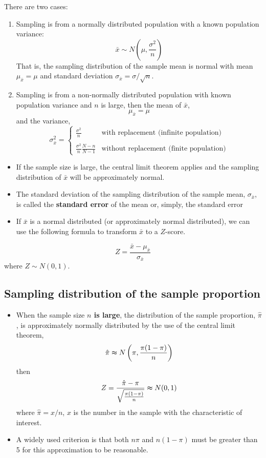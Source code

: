 \documentclass[
]{article}
\begin{document}
There are two cases:

\begin{enumerate}
\def\labelenumi{\arabic{enumi}.}
\item
  Sampling is from a normally distributed population with a known
  population variance:
  \[\bar{x}\sim N\left(\mu, \frac{\sigma^2}{n}\right) \] That is, the
  sampling distribution of the sample mean is normal with mean
  \(\mu_{\bar{x}}=\mu\) and standard deviation
  \(\sigma_{\bar{x}}=\sigma/\sqrt{n}\).
\item
  Sampling is from a non-normally distributed population with known
  population variance and \(n\) is large, then the mean of \(\bar{x}\),
  \[\mu_{\bar{x}}=\mu\] and the variance,
  \[\sigma^2_{\bar{x}}=\left\{\begin{array}{ll}
  \frac{\sigma^2}{n} & \text{with replacement (infinite  population)}\\
  &\\
  \frac{\sigma^2}{n}\frac{N-n}{N-1} & \text{without replacement (finite  population)}
  \end{array}\right.\]
\end{enumerate}

\begin{itemize}
\item
  If the sample size is large, the central limit theorem applies and the
  sampling distribution of \(\bar{x}\) will be approximately normal.
\item
  The standard deviation of the sampling distribution of the sample
  mean, \(\sigma_{\bar{x}}\), is called the \textbf{standard error} of
  the mean or, simply, the standard error
\item
  If \(\bar{x}\) is a normal distributed (or approximately normal
  distributed), we can use the following formula to transform
  \(\bar{x}\) to a \(Z\)-score.
\end{itemize}

\[Z=\frac{\bar{x}-\mu_{\bar{x}}}{\sigma_{\bar{x}}}\] where
\(Z \sim N(0,1)\).

\hypertarget{sampling-distribution-of-the-sample-proportion}{%
\subsection{Sampling distribution of the sample
proportion}\label{sampling-distribution-of-the-sample-proportion}}

\begin{itemize}
\item
  When the sample size \textbf{\(n\) is large}, the distribution of the
  sample proportion, \(\hat{\pi}\), is approximately normally
  distributed by the use of the central limit theorem,
  \[\hat{\pi}\thickapprox N\left(\pi,\frac{\pi(1-\pi)}{n}\right)\] then
  \[Z=\frac{\hat{\pi}-\pi}{\sqrt{\frac{\pi(1-\pi)}{n}}}\thickapprox N(0,1)\]
  where \(\hat{\pi}=x/n\), \(x\) is the number in the sample with the
  characteristic of interest.
\item
  A widely used criterion is that both \(n\pi\) and \(n(1-\pi)\) must be
  greater than 5 for this approximation to be reasonable.
\end{itemize}
\end{document}
